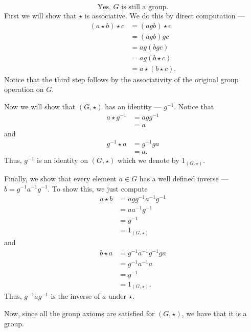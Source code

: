 \documentclass[12 pt, letterpaper]{hmcpset}
\begin{document}
\begin{solution}
	\[
		\boxed{
			\text{Yes, } G \text{ is still a group.}
		}
	\] 
	First we will show that $\star$ is associative. We do this by direct computation ---
	\[
		\begin{split}
			(a \star b) \star c & = (agb) \star c \\
					    & = (agb)gc \\
					    & = ag(bgc) \\
					    & = ag(b \star c) \\
					    & = a \star (b \star c).
		\end{split}
	\]
	Notice that the third step follows by the associativity of the original group operation on $G$. 

	Now we will show that $(G, \star)$ has an identity --- $g^{-1}$. Notice that
	\[
		\begin{split}
			a \star g^{-1} & = a g g^{-1} \\
				       & = a
		\end{split}
	\]
	and
	 \[
		\begin{split}
			g^{-1} \star a & = g^{-1} g a \\
				       & = a.
		\end{split}
	\]
	Thus, $g^{-1}$ is an identity on $(G, \star)$ which we denote by $1_{(G, \star)}$. 

	Finally, we show that every element $a \in G$ has a well defined inverse --- $b = g^{-1} a^{-1} g^{-1}$. To show this, we just compute
	\[
		\begin{split}
			a \star b & = a g g^{-1} a^{-1} g^{-1} \\
				  & = a a^{-1} g^{-1} \\
				  & = g^{-1} \\
				  & = 1_{(G, \star)}
		\end{split}
	\]
	and
	\[
		\begin{split}
			b \star a & = g^{-1} a^{-1} g^{-1} g a \\
				  & = g^{-1} a^{-1} a \\
				  & = g^{-1} \\
				  & = 1_{(G, \star)}.
		\end{split}
	\]
	Thus, $g^{-1} a g^{-1}$ is the inverse of $a$ under $\star$. 

	Now, since all the group axioms are satisfied for $(G, \star)$, we have that it is a group.
\end{solution}

\pagebreak
\end{document}
